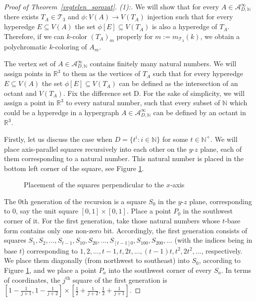 \documentclass[10pt,a4paper]{amsart}
\newcommand{\N}{\mathbb{N}}
\begin{document}
\begin{proof}[Proof of Theorem~\ref{vegtelen_sorozat}. (1):]
    We will show that for every $A \in \mathcal{A}_{D,\N}^{\infty}$ there exists $T_A \in \mathcal{T}_3$ and $\phi :V(A)\to V(T_A)$ injection such that for every hyperedge $E \subseteq V(A)$ the set $\phi [E]\subseteq V(T_A)$ is also a hyperedge of $T_A$. Therefore, if we can $k$-color $\left(T_A\right)_m$ properly for $m:=m_{\mathcal{T}_3}(k)$, we obtain a polychromatic $k$-coloring of $A_{m}$.
    
    The vertex set of $A \in \mathcal{A}_{D,\N}^{\infty}$ contains finitely many natural numbers. We will assign points in $\mathbb{R}^3$ to them as the vertices of $T_A$ such that for every hyperedge $E \subseteq V(A)$ the set $\phi [E]\subseteq V(T_A)$ can be defined as the intersection of an octant and $V(T_A)$. Fix the difference set D. For the sake of simplicity, we will assign a point in $\mathbb{R}^3$ to every natural number, such that every subset of $\mathbb{N}$ which could be a hyperedge in a hypergraph $A \in \mathcal{A}_{D,\N}^{\infty}$ can be defined by an octant in $\mathbb{R}^3$. 
    
    Firstly, let us discuss the case when $D = \{t^i: i \in \mathbb{N}\}$ for some $t \in \mathbb{N}^+$. We will place axis-parallel squares recursively into each other on the $y$-$z$ plane, each of them corresponding to a natural number. This natural number is placed in the bottom left corner of the square, see Figure \ref{negyzetek}.
    
    \begin{figure} [h!]
    \centering
    
    \caption{Placement of the squares perpendicular to the $x$-axis}
    \label{negyzetek}
\end{figure}
    
    The $0$th generation of the recursion is a square $S_0$ in the $y$-$z$ plane, corresponding to $0$, say the unit square $[0,1]\times[0,1]$. Place a point $P_0$ in the southwest corner of it. For the first generation, take those natural numbers whose $t$-base form contains only one non-zero bit. Accordingly, the first generation consists of squares $S_1, S_2,...,S_{t-1}, S_{10}, S_{20}, ..., S_{[t-1]0}, S_{100}, S_{200}, ...$ (with the indices being in base $t$) corresponding to $1, 2, ..., t-1, t, 2t, ..., (t-1)t, t^2, 2t^2, ...$, respectively. We place them diagonally (from northwest to southeast) into $S_0$, according to Figure \ref{negyzetek}, and we place a point $P_a$ into the southwest corner of every $S_a$. In terms of coordinates, the $j^\text{th}$ square of the first generation is $\left[1-\frac{1}{j+1}, 1-\frac{1}{j+2}\right]\times\left[\frac{1}{2}+\frac{1}{j+2},\frac{1}{2}+\frac{1}{j+1}\right]$.
    

\end{proof}
\end{document}
